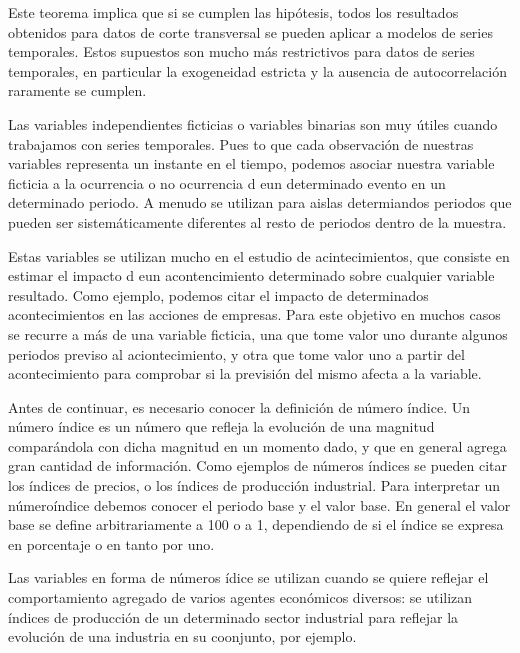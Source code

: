 Este teorema implica que si se cumplen las hip\'otesis, todos los resultados obtenidos para datos de corte transversal se pueden aplicar a modelos de series temporales. Estos supuestos son mucho m\'as restrictivos para datos de series temporales, en particular la exogeneidad estricta y la ausencia de autocorrelaci\'on raramente se cumplen.


Las variables independientes ficticias o variables binarias son muy \'utiles cuando trabajamos con series temporales. Pues to que cada observaci\'on de nuestras variables representa un instante en el tiempo, podemos asociar nuestra variable ficticia a la ocurrencia o no ocurrencia d eun determinado evento en un determinado periodo. A menudo se utilizan para aislas determiandos periodos que pueden ser sistem\'aticamente diferentes al resto de periodos dentro de la muestra.

Estas variables se utilizan mucho en el estudio de acintecimientos, que consiste en estimar el impacto d eun acontencimiento determinado sobre cualquier variable resultado. Como ejemplo, podemos citar el impacto de determinados acontecimientos en las acciones de empresas. Para este objetivo en muchos casos se recurre a m\'as de una variable ficticia, una que tome valor uno durante algunos periodos previso al aciontecimiento, y otra que tome valor uno a partir del acontecimiento para comprobar si la previsi\'on del mismo afecta a la variable.

Antes de continuar, es necesario conocer la definici\'on de n\'umero \'indice. Un n\'umero \'indice es un n\'umero que refleja la evoluci\'on de una magnitud compar\'andola con dicha magnitud en un momento dado, y que en general agrega gran cantidad de informaci\'on. Como ejemplos de n\'umeros \'indices se pueden citar los \'indices de precios, o los \'indices de producci\'on industrial. Para interpretar un n\'umero\'indice debemos conocer el periodo base y el valor base. En general el valor base se define arbitrariamente a 100 o a 1, dependiendo de si el \'indice se expresa en porcentaje o en tanto por uno.

Las variables en forma de n\'umeros \'idice se utilizan cuando se quiere reflejar el comportamiento agregado de varios agentes econ\'omicos diversos: se utilizan \'indices de producci\'on de un determinado sector industrial para reflejar la evoluci\'on de una industria en su coonjunto, por ejemplo.

